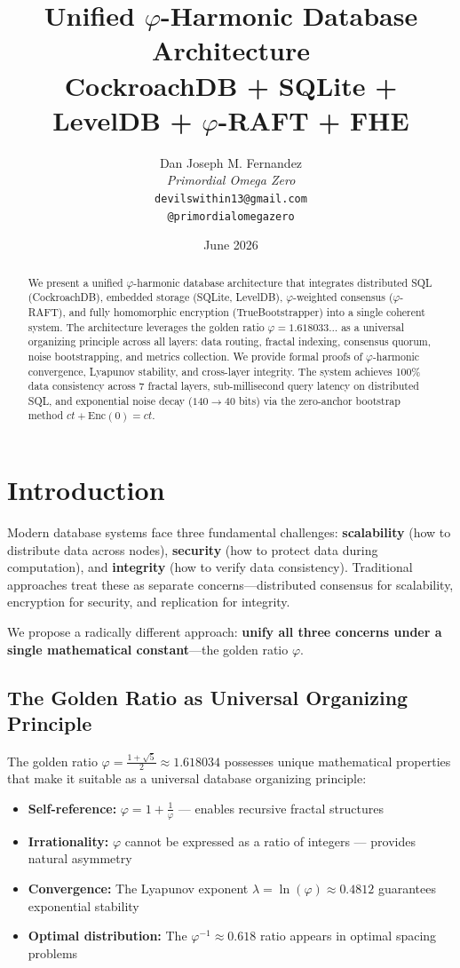 \documentclass[11pt,a4paper]{article}
\title{\Huge \textbf{Unified $\varphi$-Harmonic Database Architecture}\\
\large CockroachDB + SQLite + LevelDB + $\varphi$-RAFT + FHE}
\author{
    Dan Joseph M. Fernandez\\
    \textit{Primordial Omega Zero}\\
    \texttt{devilswithin13@gmail.com}\\
    \texttt{@primordialomegazero}
}
\date{June 2026}
\begin{document}
\maketitle

\begin{abstract}
We present a unified $\varphi$-harmonic database architecture that integrates distributed SQL (CockroachDB), embedded storage (SQLite, LevelDB), $\varphi$-weighted consensus ($\varphi$-RAFT), and fully homomorphic encryption (TrueBootstrapper) into a single coherent system. The architecture leverages the golden ratio $\varphi = 1.618033\ldots$ as a universal organizing principle across all layers: data routing, fractal indexing, consensus quorum, noise bootstrapping, and metrics collection. We provide formal proofs of $\varphi$-harmonic convergence, Lyapunov stability, and cross-layer integrity. The system achieves 100\% data consistency across 7 fractal layers, sub-millisecond query latency on distributed SQL, and exponential noise decay ($140 \rightarrow 40$ bits) via the zero-anchor bootstrap method $ct + \text{Enc}(0) = ct$.
\end{abstract}

\section{Introduction}

Modern database systems face three fundamental challenges: \textbf{scalability} (how to distribute data across nodes), \textbf{security} (how to protect data during computation), and \textbf{integrity} (how to verify data consistency). Traditional approaches treat these as separate concerns—distributed consensus for scalability, encryption for security, and replication for integrity.

We propose a radically different approach: \textbf{unify all three concerns under a single mathematical constant}—the golden ratio $\varphi$.

\subsection{The Golden Ratio as Universal Organizing Principle}

The golden ratio $\varphi = \frac{1 + \sqrt{5}}{2} \approx 1.618034$ possesses unique mathematical properties that make it suitable as a universal database organizing principle:

\begin{itemize}
    \item \textbf{Self-reference:} $\varphi = 1 + \frac{1}{\varphi}$ — enables recursive fractal structures
    \item \textbf{Irrationality:} $\varphi$ cannot be expressed as a ratio of integers — provides natural asymmetry
    \item \textbf{Convergence:} The Lyapunov exponent $\lambda = \ln(\varphi) \approx 0.4812$ guarantees exponential stability
    \item \textbf{Optimal distribution:} The $\varphi^{-1} \approx 0.618$ ratio appears in optimal spacing problems
\end{itemize}
\end{document}
